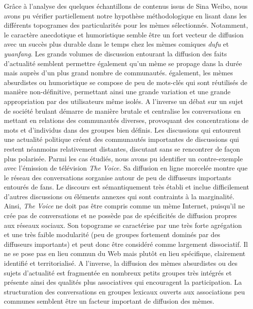 Gr\^ace à l{\textquoteright}analyse des quelques échantillons de contenus issus de Sina Weibo, nous avons pu vérifier partiellement notre hypothèse méthodologique en lisant dans les différents topogrames des particularités pour les mèmes sélectionnés. Notamment, le caractère anecdotique et humoristique semble \^etre un fort vecteur de diffusion avec un succès plus durable dans le temps chez les mèmes comiques \textit{dufu} et \textit{yuanfang}. Les grands volumes de discussion entourant la diffusion des faits d{\textquoteright}actualité semblent permettre également qu{\textquoteright}un mème se propage dans la durée mais auprès d{\textquoteright}un plus grand nombre de communautés. également, les mèmes absurdistes ou humoristique se compose de peu de mots-clés qui sont réutilisés de manière non-définitive, permettant ainsi une grande variation et une grande appropriation par des utilisateurs m\^eme isolés. A l{\textquoteright}inverse un débat sur un sujet de société brulant démarre de manière brutale et centralise les conversations en mettant en relations des communautés diverses, provoquant des concentrations de mots et d{\textquoteright}individus dans des groupes bien définis. Les discussions qui entourent une actualité politique créent des communautés importantes de discussions qui restent néanmoins relativement distantes, discutant sans se rencontrer de fa\c{c}on plus polarisée. Parmi les cas étudiés, nous avons pu identifier un contre-exemple avec l{\textquoteright}émission de télévision \textit{The Voice}\textit{. }Sa diffusion en ligne morcelée montre que le réseau des conversations s{\textquotesingle}organise autour de peu de diffuseurs importants entourés de fans. Le discours est sémantiquement très établi et inclue difficilement d{\textquoteright}autres discussions ou éléments annexes qui sont contraints à la marginalité. Ainsi, \textit{The Voice }ne doit pas \^etre compris comme un mème Internet, puisqu{\textquoteright}il ne crée pas de conversations et ne possède pas de spécificités de diffusion propres aux réseaux sociaux. Son topograme se caractérise par une très forte agrégation et une très faible modularité (peu de groupes fortement dominés par des diffuseurs importants) et peut donc \^etre considéré comme largement dissociatif. Il ne se pose pas en lieu commun du Web mais plut\^ot en lieu spécifique, clairement identifié et territorialisé. A l{\textquoteright}inverse, la diffusion des mèmes absurdistes ou des sujets d{\textquoteright}actualité est fragmentée en nombreux petits groupes très intégrés et présente ainsi des qualités plus associatives qui encouragent la participation. La structuration des conversations en groupes lexicaux ouverts aux associations peu communes semblent \^etre un facteur important de diffusion des mèmes.
 
